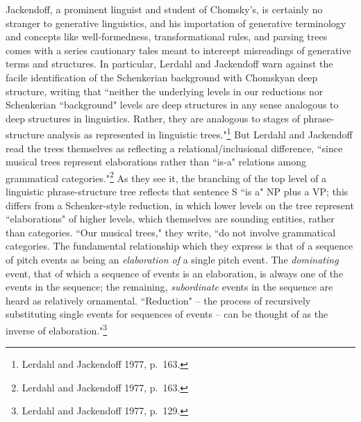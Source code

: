 Jackendoff, a prominent linguist and student of Chomsky's, is certainly no stranger to generative linguistics, and his importation of generative terminology and concepts like well-formedness, transformational rules, and parsing trees comes with a series cautionary tales meant to intercept misreadings of generative terms and structures.  In particular, Lerdahl and Jackendoff warn against the facile identification of the Schenkerian background with Chomskyan deep structure, writing that ``neither the underlying levels in our reductions nor Schenkerian ``background" levels are deep structures in any sense analogous to deep structures in linguistics.  Rather, they are analogous to stages of phrase-structure analysis as represented in linguistic trees."\footnote{Lerdahl and Jackendoff 1977, p.\ 163.}  But Lerdahl and Jackendoff read the trees themselves as reflecting a relational/inclusional difference, ``since musical trees represent elaborations rather than ``is-a" relations among grammatical categories."\footnote{Lerdahl and Jackendoff 1977, p.\ 163.}  As they see it, the branching of the top level of a linguistic phrase-structure tree reflects that sentence S ``is a" NP plus a VP; this differs from a Schenker-style reduction, in which lower levels on the tree represent ``elaborations" of higher levels, which themselves are sounding entities, rather than categories.  ``Our musical trees," they write, ``do not involve grammatical categories.  The fundamental relationship which they express is that of a sequence of pitch events as being an \emph{elaboration of} a single pitch event.  The \emph{dominating} event, that of which a sequence of events is an elaboration, is always one of the events in the sequence; the remaining, \emph{subordinate} events in the sequence are heard as relatively ornamental.  ``Reduction" -- the process of recursively substituting single events for sequences of events -- can be thought of as the inverse of elaboration."\footnote{Lerdahl and Jackendoff 1977, p.\ 129.}

